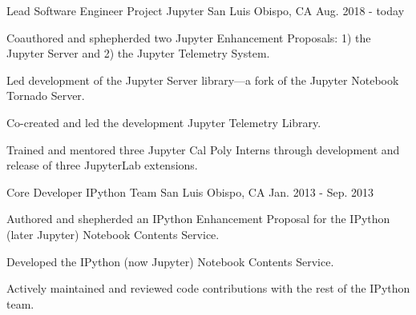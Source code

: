 
\begin{cventries}

  \cventry
    {Lead Software Engineer}
    {Project Jupyter} %
    {San Luis Obispo, CA} %
    {Aug. 2018 - today} %
    {
      \begin{cvitems} %
        \item {Coauthored and sphepherded two Jupyter Enhancement Proposals: 1) the Jupyter Server and 2) the Jupyter Telemetry System.}
        \item {Led development of the Jupyter Server library—a fork of the Jupyter Notebook Tornado Server.}
        \item {Co-created and led the development Jupyter Telemetry Library.}
        \item {Trained and mentored three Jupyter Cal Poly Interns through development and release of three JupyterLab extensions.}
      \end{cvitems}
    }

  \cventry
    {Core Developer}
    {IPython Team} %
    {San Luis Obispo, CA} %
    {Jan. 2013 - Sep. 2013} %
    {
      \begin{cvitems} %
        \item {Authored and shepherded an IPython Enhancement Proposal for the IPython (later Jupyter) Notebook Contents Service.}
        \item {Developed the IPython (now Jupyter) Notebook Contents Service.}
        \item {Actively maintained and reviewed code contributions with the rest of the IPython team.}
      \end{cvitems}
    }


\end{cventries}
